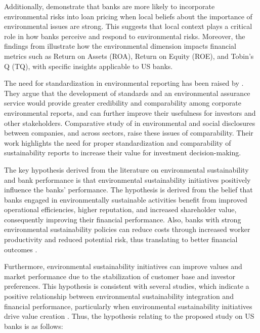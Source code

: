\documentclass[11pt, a4paper]{article}
\begin{document}
Additionally, \cite{Erten2024} demonstrate that banks are more likely to incorporate environmental risks into loan pricing when local beliefs about the importance of environmental issues are strong. This suggests that local context plays a critical role in how banks perceive and respond to environmental risks. Moreover, the findings from \cite{Ponce2023} illustrate how the environmental dimension impacts financial metrics such as Return on Assets (ROA), Return on Equity (ROE), and Tobin's Q (TQ), with specific insights applicable to US banks.

The need for standardization in environmental reporting has been raised by \cite{Neu1998}. They argue that the development of standards and an environmental assurance service would provide greater credibility and comparability among corporate environmental reports, and can further improve their usefulness for investors and other stakeholders. Comparative study of \cite{Thistlethwaite2016} in environmental and social disclosures between companies, and across sectors, raise these issues of comparability. Their work highlights the need for proper standardization and comparability of sustainability reports to increase their value for investment decision-making.


The key hypothesis derived from the literature on environmental sustainability and bank performance is that environmental sustainability initiatives positively influence the banks' performance. The hypothesis is derived from the belief that banks engaged in environmentally sustainable activities benefit from improved operational efficiencies, higher reputation, and increased shareholder value, consequently improving their financial performance. Also, banks with strong environmental sustainability policies can reduce costs through increased worker productivity and reduced potential risk, thus translating to better financial outcomes \citep{Menicucci2023}. 

Furthermore, environmental sustainability initiatives can improve values and market performance due to the stabilization of customer base and investor preferences. This hypothesis is consistent with several studies, which indicate a positive relationship between environmental sustainability integration and financial performance, particularly when environmental sustainability initiatives drive value creation \citep{Cabaleiro2024, Bauer2014}. Thus, the hypothesis relating to the proposed study on US banks is as follows:
\end{document}
